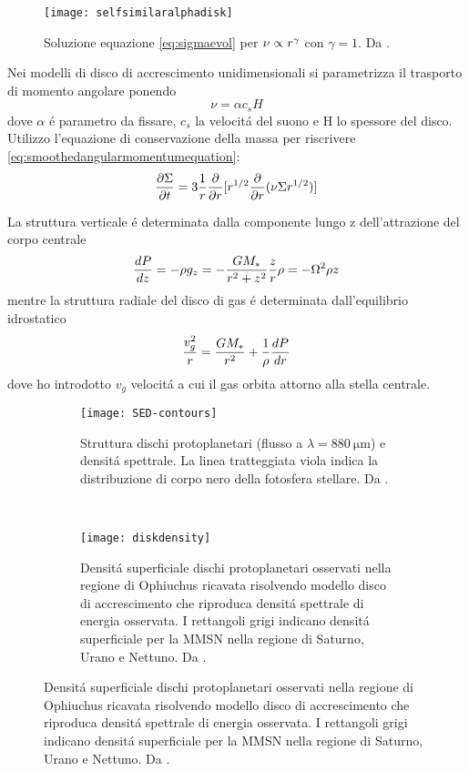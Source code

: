 \begin{wrapfigure}[17]{l}{0.5\textwidth}
	\texttt{[image: selfsimilaralphadisk]}
	\caption{Soluzione equazione \eqref{eq:sigmaevol} per $\nu\propto r\expy{\gamma}$ con $\gamma=1$. Da \cite{armitage2007lecture}.}\label{fig:selfsimilaralphadisk}
\end{wrapfigure}

Nei modelli di disco di accrescimento unidimensionali si parametrizza il trasporto di momento angolare ponendo
\begin{equation}
\nu=\alpha c_s H
\end{equation}
dove $\alpha$ \'e parametro da fissare, $c_s$ la velocit\'a del suono e H lo spessore del disco. Utilizzo l'equazione di conservazione della massa per riscrivere \eqref{eq:smoothedangularmomentumequation}:
\begin{equation}
\PDy{t}{\Sigma}=3\frac{1}{r}\PDof{r}[r\expy{1/2}\PDof{r}(\nu\Sigma r\expy{1/2})]\label{eq:sigmaevol}
\end{equation}

La struttura verticale \'e determinata dalla componente lungo z dell'attrazione del corpo centrale
\begin{equation}
\TDy{z}{P}=-\rho g_z=-\frac{GM_*}{r^2+z^2}\frac{z}{r}\rho=-\Omega^2\rho z
\end{equation}
mentre la struttura radiale del disco di gas \'e determinata dall'equilibrio idrostatico
\begin{equation}
\frac{v_g^2}{r}=\frac{GM_*}{r^2}+\frac{1}{\rho}\TDy{r}{P}
\end{equation}
dove ho introdotto $v_g$ velocit\'a a cui il gas orbita attorno alla stella centrale.

\begin{figure}[!ht]
	\begin{subfigure}[b]{0.39\textwidth}
		\centering
		\texttt{[image: SED-contours]}
		\caption{Struttura dischi protoplanetari (flusso a $\lambda=\SI{880}{\micro\meter}$) e densit\'a spettrale. La linea tratteggiata viola indica la distribuzione di corpo nero della fotosfera stellare. Da \cite{andrews2010protoplanetary}.}\label{fig:SED-contours}
	\end{subfigure}
	~
	\begin{subfigure}[b]{0.55\textwidth}
		\texttt{[image: diskdensity]}
		\caption{Densit\'a superficiale dischi protoplanetari osservati nella regione di Ophiuchus ricavata risolvendo modello disco di accrescimento che riproduca densit\'a spettrale di energia osservata. I rettangoli grigi indicano densit\'a superficiale per la MMSN nella regione di Saturno, Urano e Nettuno. Da \cite{andrews2010protoplanetary}.}\label{fig:diskdensity}
	\end{subfigure}
\end{figure}


